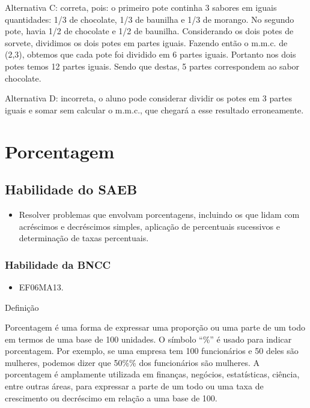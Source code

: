 Alternativa C: correta, pois: o primeiro pote continha 3 sabores em
iguais quantidades: 1/3 de chocolate, 1/3 de baunilha e 1/3 de morango.
No segundo pote, havia 1/2 de chocolate e 1/2 de baunilha. Considerando
os dois potes de sorvete, dividimos os dois potes em partes iguais.
Fazendo então o m.m.c. de (2,3), obtemos que cada pote foi dividido em 6
partes iguais. Portanto nos dois potes temos 12 partes iguais. Sendo que
destas, 5 partes correspondem ao sabor chocolate.

Alternativa D: incorreta, o aluno pode considerar dividir os potes em 3
partes iguais e somar sem calcular o m.m.c., que chegará a esse
resultado erroneamente.

\chapter{Porcentagem}

\section{Habilidade do SAEB}

\begin{itemize}

    \item Resolver problemas que envolvam porcentagens,
incluindo os que lidam com acréscimos e decréscimos simples, aplicação
de percentuais sucessivos e determinação de taxas percentuais.

\end{itemize}

\subsection{Habilidade da BNCC} 

\begin{itemize}

    \item EF06MA13.

\end{itemize}

Definição

Porcentagem é uma forma de expressar uma proporção ou uma parte de um
todo em termos de uma base de 100 unidades. O símbolo ``\%'' é usado
para indicar porcentagem. Por exemplo, se uma empresa tem 100
funcionários e 50 deles são mulheres, podemos dizer que 50\%\% dos
funcionários são mulheres. A porcentagem é amplamente utilizada em
finanças, negócios, estatísticas, ciência, entre outras áreas, para
expressar a parte de um todo ou uma taxa de crescimento ou decréscimo em
relação a uma base de 100.

